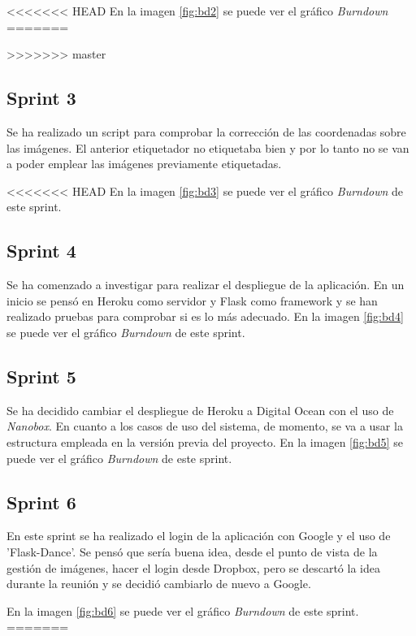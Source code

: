 <<<<<<< HEAD
En la imagen \ref{fig:bd2} se puede ver el gráfico \textit{Burndown} 
=======
 
>>>>>>> master

\subsection{Sprint 3}
Se ha realizado un script para comprobar la corrección de las coordenadas sobre las imágenes. El anterior etiquetador no etiquetaba bien y por lo tanto no se van a poder emplear las imágenes previamente etiquetadas.

<<<<<<< HEAD
En la imagen \ref{fig:bd3} se puede ver el gráfico \textit{Burndown} de este sprint.
\subsection{Sprint 4}
Se ha comenzado a investigar para realizar el despliegue de la aplicación. En un inicio se pensó en Heroku como servidor y Flask como framework y se han realizado pruebas para comprobar si es lo más adecuado. 
En la imagen \ref{fig:bd4} se puede ver el gráfico \textit{Burndown} de este sprint.
\subsection{Sprint 5}
Se ha decidido cambiar el despliegue de Heroku a Digital Ocean con el uso de \textit{Nanobox}. En cuanto a los casos de uso del sistema, de momento, se va a usar la estructura empleada en la versión previa del proyecto.
En la imagen \ref{fig:bd5} se puede ver el gráfico \textit{Burndown} de este sprint.
\subsection{Sprint 6}
En este sprint se ha realizado el login de la aplicación con Google y el uso de 'Flask-Dance'. Se pensó que sería buena idea, desde el punto de vista de la gestión de imágenes, hacer el login desde Dropbox, pero se descartó la idea durante la reunión y se decidió cambiarlo de nuevo a Google.


En la imagen \ref{fig:bd6} se puede ver el gráfico \textit{Burndown} de este sprint.
=======

